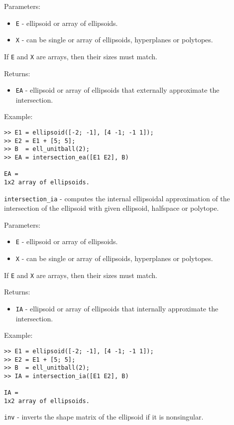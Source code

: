 Parameters:
\begin{itemize}
\item {\tt E} - ellipsoid or array of ellipsoids.
\item {\tt X} - can be single or array of ellipsoids, hyperplanes or polytopes.
\end{itemize}
If {\tt E} and {\tt X} are arrays, then their sizes must match.

Returns:
\begin{itemize}
\item {\tt EA} - ellipsoid or array of ellipsoids that externally approximate
the intersection.
\end{itemize}

Example:
{\tt \begin{verbatim}
>> E1 = ellipsoid([-2; -1], [4 -1; -1 1]);
>> E2 = E1 + [5; 5];
>> B  = ell_unitball(2);
>> EA = intersection_ea([E1 E2], B)

EA =
1x2 array of ellipsoids.
\end{verbatim} }

\newpage

{\Large {\tt intersection\_ia}} - computes the internal ellipsoidal
approximation of the intersection of the ellipsoid with given ellipsoid,
halfspace or polytope.

Parameters:
\begin{itemize}
\item {\tt E} - ellipsoid or array of ellipsoids.
\item {\tt X} - can be single or array of ellipsoids, hyperplanes or polytopes.
\end{itemize}
If {\tt E} and {\tt X} are arrays, then their sizes must match.

Returns:
\begin{itemize}
\item {\tt IA} - ellipsoid or array of ellipsoids that internally approximate
the intersection.
\end{itemize}

Example:
{\tt \begin{verbatim}
>> E1 = ellipsoid([-2; -1], [4 -1; -1 1]);
>> E2 = E1 + [5; 5];
>> B  = ell_unitball(2);
>> IA = intersection_ia([E1 E2], B)

IA =
1x2 array of ellipsoids.
\end{verbatim} }

\newpage

{\Large {\tt inv}} - inverts the shape matrix of the ellipsoid if it is
nonsingular.

